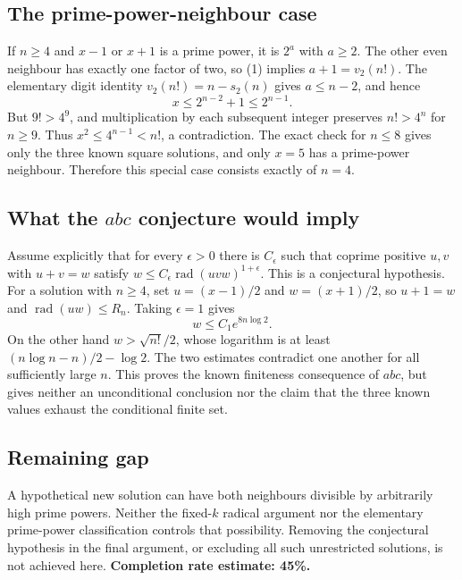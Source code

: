 \subsection*{The prime-power-neighbour case}
If $n\ge4$ and $x-1$ or $x+1$ is a prime power, it is $2^a$ with $a\ge2$. The other even neighbour has exactly one factor of two, so (1) implies $a+1=v_2(n!)$. The elementary digit identity $v_2(n!)=n-s_2(n)$ gives $a\le n-2$, and hence
\[
 x\le2^{n-2}+1\le2^{n-1}.
\]
But $9!>4^9$, and multiplication by each subsequent integer preserves $n!>4^n$ for $n\ge9$. Thus $x^2\le4^{n-1}<n!$, a contradiction. The exact check for $n\le8$ gives only the three known square solutions, and only $x=5$ has a prime-power neighbour. Therefore this special case consists exactly of $n=4$.

\subsection*{What the $abc$ conjecture would imply}
Assume explicitly that for every $\epsilon>0$ there is $C_\epsilon$ such that coprime positive $u,v$ with $u+v=w$ satisfy
$w\le C_\epsilon\operatorname{rad}(uvw)^{1+\epsilon}$.
This is a conjectural hypothesis. For a solution with $n\ge4$, set $u=(x-1)/2$ and $w=(x+1)/2$, so $u+1=w$ and $\operatorname{rad}(uw)\le R_n$. Taking $\epsilon=1$ gives
\[
 w\le C_1 e^{8n\log2}.
\]
On the other hand $w>\sqrt{n!}/2$, whose logarithm is at least $(n\log n-n)/2-\log2$. The two estimates contradict one another for all sufficiently large $n$. This proves the known finiteness consequence of $abc$, but gives neither an unconditional conclusion nor the claim that the three known values exhaust the conditional finite set.

\subsection*{Remaining gap}
A hypothetical new solution can have both neighbours divisible by arbitrarily high prime powers. Neither the fixed-$k$ radical argument nor the elementary prime-power classification controls that possibility. Removing the conjectural hypothesis in the final argument, or excluding all such unrestricted solutions, is not achieved here.
\textbf{Completion rate estimate: 45\%.}
